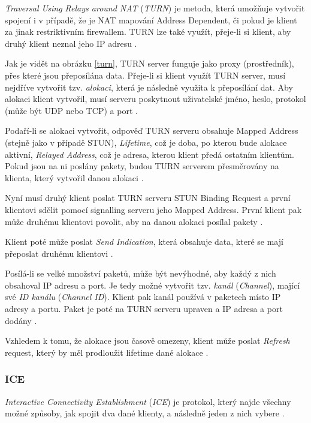 \textit{Traversal Using Relays around NAT} (\textit{TURN}) je metoda, která
umožňuje vytvořit spojení i v případě, že je NAT mapování Address Dependent, či
pokud je klient za jinak restriktivním firewallem. TURN lze také využít,
přeje-li si klient, aby druhý klient neznal jeho IP adresu
\cite{WebRTCForTheCurious}.

Jak je vidět na obrázku \ref{turn}, TURN server funguje jako proxy (prostředník),
přes které jsou přeposílána data. Přeje-li si klient využít TURN server, musí
nejdříve vytvořit tzv. \textit{alokaci}, která je následně využita k přeposílání
dat. Aby alokaci klient vytvořil, musí serveru poskytnout uživatelské jméno,
heslo, protokol (může být UDP nebo TCP) a port \cite{WebRTCForTheCurious}.

Podaří-li se alokaci vytvořit, odpověď TURN serveru obsahuje Mapped Address
(stejně jako v případě STUN), \textit{Lifetime}, což je doba, po kterou bude
alokace aktivní, \textit{Relayed Address}, což je adresa, kterou klient předá
ostatním klientům. Pokud jsou na ni poslány pakety, budou TURN serverem
přesměrovány na klienta, který vytvořil danou alokaci
\cite{WebRTCForTheCurious}.

Nyní musí druhý klient poslat TURN serveru STUN Binding Request a první
klientovi sdělit pomocí signalling serveru jeho Mapped Address. První klient pak
může druhému klientovi povolit, aby na danou alokaci posílal pakety
\cite{WebRTCForTheCurious}.

Klient poté může poslat \textit{Send Indication}, která obsahuje data, které se
mají přeposlat druhému klientovi \cite{WebRTCForTheCurious}.

Posílá-li se velké množství paketů, může být nevýhodné, aby každý z nich
obsahoval IP adresu a port. Je tedy možné vytvořit tzv. \textit{kanál}
(\textit{Channel}), mající své \textit{ID kanálu} (\textit{Channel ID}). Klient
pak kanál používá v paketech místo IP adresy a portu. Paket je poté na TURN
serveru upraven a IP adresa a port dodány \cite{WebRTCForTheCurious}.

Vzhledem k tomu, že alokace jsou časově omezeny, klient může poslat
\textit{Refresh} request, který by měl prodloužit lifetime dané alokace
\cite{WebRTCForTheCurious}.

\subsubsection{ICE}\label{ice}

\textit{Interactive Connectivity Establishment} (\textit{ICE}) je protokol,
který najde všechny možné způsoby, jak spojit dva dané klienty, a následně jeden
z nich vybere \cite{WebRTCForTheCurious}.

